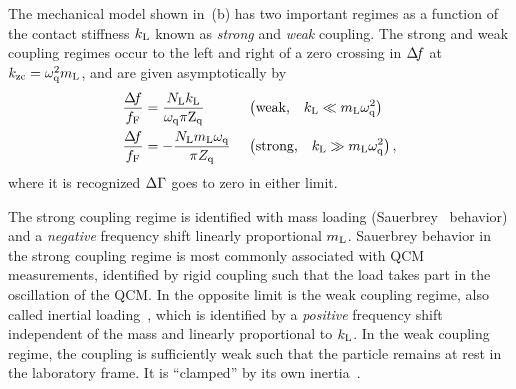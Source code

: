 The mechanical model shown in \,(b) has
two important regimes as a function of the contact stiffness $k_\mathrm{L}$ known
as \textit{strong} and \textit{weak} coupling.  The strong and weak
coupling regimes occur to the left and right of a zero crossing in $\Delta\!f$ at
$k_\mathrm{zc}=\omega_\mathrm{q}^2 m_\mathrm{L}$, and are given asymptotically by
\begin{align}
\frac{\Delta\!f}{f_\mathrm{F}}&=
\frac{N_\mathrm{L} k_\mathrm{L}}
{\omega_\mathrm{q}\pi \mathrm{Z}_\mathrm{q}}
&\,&\left(\text{weak,}\quad k_\mathrm{L}\ll m_\mathrm{L}
\omega_\mathrm{q}^2\right)
\label{eqn:couplinguy1}
\\
\frac{\Delta\!f}{f_\mathrm{F}}&=  -\frac{N_\mathrm{L}
m_\mathrm{L} \omega_\mathrm{q}}{\pi Z_\mathrm{q}}
&\,&\left(\text{strong,}\quad k_\mathrm{L}\gg m_\mathrm{L}
\omega_\mathrm{q}^2\right),
\label{eqn:couplinguy2}
\end{align}
where it is recognized $\Delta\Gamma$ goes to zero in either limit.

The strong coupling regime is identified with mass loading
(Sauerbrey~\cite{sauerbrey1959verwendung} behavior) and a \textit{negative}
frequency shift linearly proportional $m_\mathrm{L}$.  Sauerbrey behavior in the
strong coupling regime is most commonly associated with QCM measurements,
identified by rigid coupling such that the load takes part in the
oscillation of the QCM\@.  In the opposite limit is the weak coupling regime,
also called inertial loading~\cite{dybwad1985sensitive}, which is identified
by a \textit{positive} frequency shift independent of the mass and linearly
proportional to $k_\mathrm{L}$.  In the weak coupling regime, the coupling is
sufficiently weak such that the particle remains at rest in the laboratory
frame.  It is ``clamped'' by its own inertia~\cite{du2008role}.


